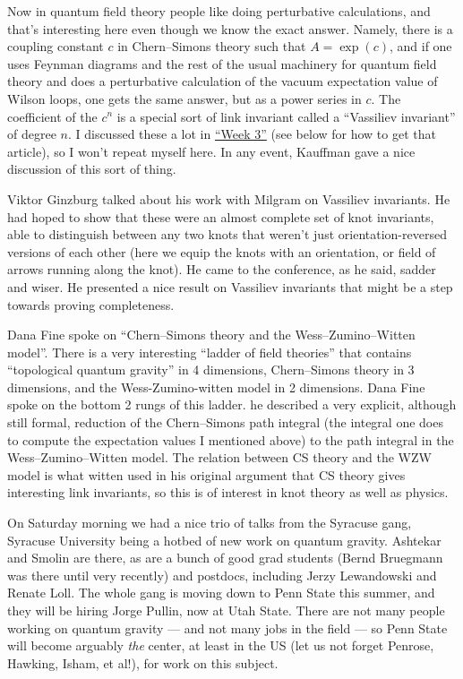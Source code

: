 \documentclass[12pt]{article}
\begin{document}
Now in quantum field theory people like doing perturbative calculations,
and that's interesting here even though we know the exact answer.
Namely, there is a coupling constant \(c\) in Chern--Simons theory such
that \(A = \exp(c)\), and if one uses Feynman diagrams and the rest of
the usual machinery for quantum field theory and does a perturbative
calculation of the vacuum expectation value of Wilson loops, one gets
the same answer, but as a power series in \(c\). The coefficient of the
\(c^n\) is a special sort of link invariant called a ``Vassiliev
invariant'' of degree \(n\). I discussed these a lot in
\protect\hyperlink{week3}{``Week 3''} (see below for how to get that
article), so I won't repeat myself here. In any event, Kauffman gave a
nice discussion of this sort of thing.

Viktor Ginzburg talked about his work with Milgram on Vassiliev
invariants. He had hoped to show that these were an almost complete set
of knot invariants, able to distinguish between any two knots that
weren't just orientation-reversed versions of each other (here we equip
the knots with an orientation, or field of arrows running along the
knot). He came to the conference, as he said, sadder and wiser. He
presented a nice result on Vassiliev invariants that might be a step
towards proving completeness.

Dana Fine spoke on ``Chern--Simons theory and the Wess--Zumino--Witten
model''. There is a very interesting ``ladder of field theories'' that
contains ``topological quantum gravity'' in 4 dimensions, Chern--Simons
theory in 3 dimensions, and the Wess-Zumino-witten model in 2
dimensions. Dana Fine spoke on the bottom 2 rungs of this ladder. he
described a very explicit, although still formal, reduction of the
Chern--Simons path integral (the integral one does to compute the
expectation values I mentioned above) to the path integral in the
Wess--Zumino--Witten model. The relation between CS theory and the WZW
model is what witten used in his original argument that CS theory gives
interesting link invariants, so this is of interest in knot theory as
well as physics.

On Saturday morning we had a nice trio of talks from the Syracuse gang,
Syracuse University being a hotbed of new work on quantum gravity.
Ashtekar and Smolin are there, as are a bunch of good grad students
(Bernd Bruegmann was there until very recently) and postdocs, including
Jerzy Lewandowski and Renate Loll. The whole gang is moving down to Penn
State this summer, and they will be hiring Jorge Pullin, now at Utah
State. There are not many people working on quantum gravity --- and not
many jobs in the field --- so Penn State will become arguably \emph{the}
center, at least in the US (let us not forget Penrose, Hawking, Isham,
et al!), for work on this subject.
\end{document}
